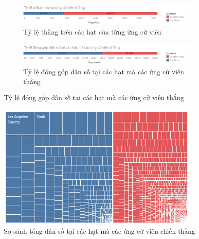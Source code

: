 \documentclass[10pt]{beamer}
\theoremstyle{remark}
\theoremstyle{definition}
\begin{document}
\begin{frame}
	\begin{figure}[h!]
        \begin{subfigure}[b]{\textwidth}
            \includegraphics[width=0.9\linewidth]{County_Total_Percentage_Candidate_Win.png}
            \caption{Tỷ lệ thắng trên các hạt của từng ứng cử viên}
        \end{subfigure}
        \vfill
        \begin{subfigure}[b]{\textwidth}
            \includegraphics[width=0.9\linewidth]{County_Percentage_Population_Candidate.png}
            \caption{Tỷ lệ đóng góp dân số tại các hạt mà các ứng cử viên thắng}
        \end{subfigure}
    \end{figure}
\end{frame}

\begin{frame}
    \begin{figure}[h!]
        \centering
        \includegraphics[width=0.9\textwidth]{figures/County_Population_Treemap.png}
        \caption{So sánh tổng dân số tại các hạt mà các ứng cử viên chiến thắng}
    \end{figure}
\end{frame}
\end{document}
